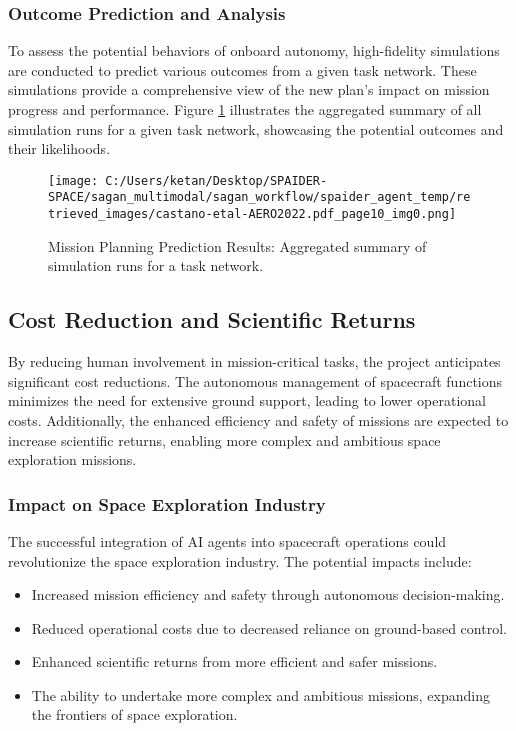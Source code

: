 \documentclass[a4paper,12pt]{article}
\begin{document}
\subsubsection{Outcome Prediction and Analysis}

To assess the potential behaviors of onboard autonomy, high-fidelity simulations are conducted to predict various outcomes from a given task network. These simulations provide a comprehensive view of the new plan's impact on mission progress and performance. Figure \ref{fig:mission-planning-prediction} illustrates the aggregated summary of all simulation runs for a given task network, showcasing the potential outcomes and their likelihoods.

\begin{figure}[htbp]
    \centering
    \texttt{[image: C:/Users/ketan/Desktop/SPAIDER-SPACE/sagan\_multimodal/sagan\_workflow/spaider\_agent\_temp/retrieved\_images/castano-etal-AERO2022.pdf\_page10\_img0.png]}
    \caption{Mission Planning Prediction Results: Aggregated summary of simulation runs for a task network.}
    \label{fig:mission-planning-prediction}
\end{figure}

\subsection{Cost Reduction and Scientific Returns}

By reducing human involvement in mission-critical tasks, the project anticipates significant cost reductions. The autonomous management of spacecraft functions minimizes the need for extensive ground support, leading to lower operational costs. Additionally, the enhanced efficiency and safety of missions are expected to increase scientific returns, enabling more complex and ambitious space exploration missions.

\subsubsection{Impact on Space Exploration Industry}

The successful integration of AI agents into spacecraft operations could revolutionize the space exploration industry. The potential impacts include:

\begin{itemize}
    \item Increased mission efficiency and safety through autonomous decision-making.
    \item Reduced operational costs due to decreased reliance on ground-based control.
    \item Enhanced scientific returns from more efficient and safer missions.
    \item The ability to undertake more complex and ambitious missions, expanding the frontiers of space exploration.
\end{itemize}
\end{document}
